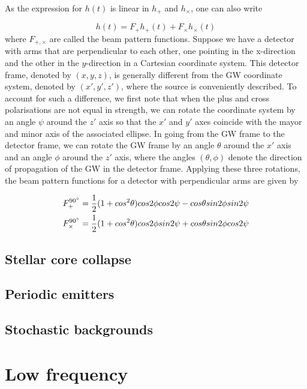 \documentclass[binding=0.6cm, LaM]{sapthesis}
\begin{document}
As the expression for $h(t)$ is linear in $h_{+}$ and $h_{\times}$, one can also write

\begin{equation}
h(t) = F_{+}h_{+} (t) + F_{\times}h_{\times}(t)
\end{equation}
where $F_{+,\times}$ are called the beam pattern functions. Suppose we have a detector with arms that are perpendicular to each other, one pointing in the x-direction and the other in the $y$-direction in a Cartesian coordinate system. This detector frame, denoted by $(x,y,z)$, is generally different from the GW coordinate system, denoted by $(x',y',z')$, where the source is conveniently described. To account for such a difference, we first note that when the plus and cross polarisations are not equal in strength, we can rotate the coordinate system by an angle $\psi$ around the $z′$ axis so that the $x′$ and $y′$ axes coincide with the mayor and minor axis of the associated ellipse. In going from the GW frame to the detector frame, we can rotate the GW frame by an angle $\theta$ around the $x′$ axis and an angle $\phi$ around the $z′$ axis, where the angles $(\theta, \phi)$ denote the direction of propagation of the GW in the detector frame. Applying these three rotations, the beam pattern functions for a detector with perpendicular arms are given by 

\begin{align}
F_{+}^{\ang{90}}& = {1 \over 2} (1 + cos^2 \theta)cos 2\phi cos 2 \psi - cos \theta sin2\phi sin2\psi \\
F_{\times}^{\ang{90}}& = {1 \over 2} (1 + cos^2 \theta)cos 2\phi sin 2 \psi + cos \theta sin2\phi cos2\psi
\end{align}




\subsection{Stellar core collapse}

\subsection{Periodic emitters}

\subsection{Stochastic backgrounds}
\section{Low frequency}
\backmatter
\cleardoublepage


\begin{thebibliography}{100}
\end{thebibliography}
\end{document}
